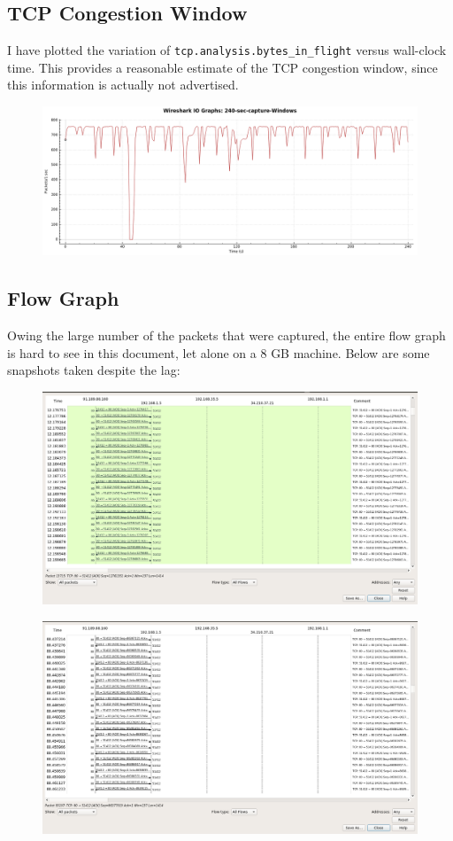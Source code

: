 \documentclass{article}
\begin{document}
\subsection{TCP Congestion Window}
\begin{flushleft}
I have plotted the variation of \texttt{tcp.analysis.bytes\_in\_flight} versus wall-clock time. This provides a reasonable estimate of the TCP congestion window, since this information is actually not advertised.
\begin{figure}[H]
\centering
\includegraphics[width=0.75\linewidth]{tcp-CWND.png}
\end{figure}
\end{flushleft}

\subsection{Flow Graph}
\begin{flushleft}
Owing the large number of the packets that were captured, the entire flow graph is hard to see in this document, let alone on a 8 GB machine. Below are some snapshots taken despite the lag:
\begin{figure}[H]
\centering
\includegraphics[width=0.6\linewidth]{flow-graph-1.png}
\end{figure}
\begin{figure}[H]
\centering
\includegraphics[width=0.6\linewidth]{flow-graph-2.png}
\end{figure}
\end{flushleft}
\end{document}

